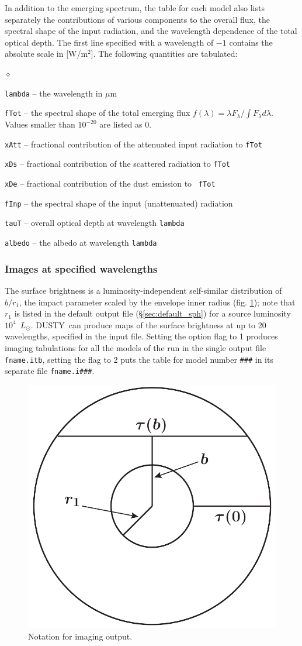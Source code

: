 \documentclass[11pt]{article}
\def\D    {{\sf DUSTY}}
\def\E#1{\hbox{$10^{#1}$}}
\def\mic    {\hbox{$\mu$m}}
\def\Lo     {\hbox{$L_{\odot}$}}
\begin{document}
In addition to the emerging spectrum, the table for each model also
lists separately the contributions of various components to the
overall flux, the spectral shape of the input radiation, and the
wavelength dependence of the total optical depth. The first line
specified with a wavelength of $-1$ contains the absolute scale in
[W/m$^2$]. The following quantities are tabulated:
\begin{list}{$\diamond$}{}
\item {\tt lambda} -- the wavelength in \mic
\item {\tt fTot} -- the spectral shape of the total emerging flux
  $f(\lambda) = \lambda F_\lambda/\int\!F_\lambda d\lambda$.  Values
  smaller than \E{-20} are listed as 0.
\item{\tt xAtt} -- fractional contribution of the attenuated input
  radiation to {\tt fTot}
\item{\tt xDs} -- fractional contribution of the scattered radiation
  to {\tt fTot}
\item{\tt xDe} -- fractional contribution of the dust emission to {\tt
    fTot}
\item{\tt fInp} -- the spectral shape of the input (unattenuated)
  radiation
\item{\tt tauT} -- overall optical depth at wavelength {\tt lambda}
\item{\tt albedo} -- the albedo at wavelength {\tt lambda}
\end{list}

\subsubsection{Images at specified wavelengths}
\label{sec:images_sph}

The surface brightness is a luminosity-independent self-similar distribution
\cite{IE96a} of $b/r_1$, the impact parameter scaled by the envelope inner
radius (fig. \ref{impact parameter}); note that $r_1$ is listed in the default
output file (\S\ref{sec:default_sph}) for a source luminosity \E4~\Lo. \D\ can
produce maps of the surface brightness at up to 20 wavelengths, specified in
the input file. Setting the option flag to 1 produces imaging tabulations for
all the models of the run in the single output file {\tt fname.itb}, setting
the flag to 2 puts the table for model number {\tt \#\#\#} in its separate
file {\tt fname.i\#\#\#}.

\begin{figure}[ht]
  \centering
  \includegraphics[width=0.40\hsize]{sphere}
  \caption{Notation for imaging output.}
  \label{impact parameter}
\end{figure}
\end{document}
